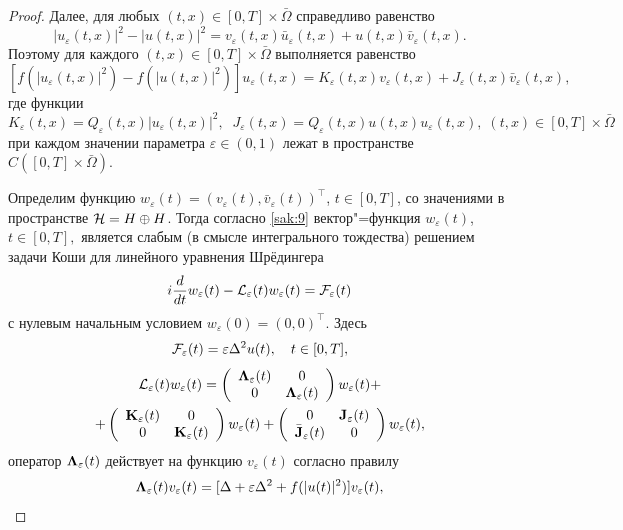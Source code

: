 \begin{proof}
Далее, для любых $(t,x)\in [0,T]\times \bar \Omega $ справедливо
равенство $$|u_{\varepsilon }(t,x)|^2-|u(t,x)|^2=v_{\varepsilon  }(t,x)\bar u_{\varepsilon }(t,x)+u(t,x)\bar v_{\varepsilon 
}(t,x).$$
Поэтому для каждого $(t,x)\in [0,T]\times \bar \Omega $ выполняется
равенство $$[f(|u_{\varepsilon }(t,x)|^2)-f(|u(t,x)|^2)]u_{\varepsilon 
}(t,x)=K_{\varepsilon }(t,x)v_{\varepsilon }(t,x)+J_{\varepsilon }(t,x)\bar v_{\varepsilon }(t,x),$$ где
функции 
$$K_{\varepsilon }(t,x)=Q_{\varepsilon }(t,x) |u_{\varepsilon }(t,x)|^2,\; \;
J_{\varepsilon }(t,x)=Q_{\varepsilon }(t,x) u(t,x)u_{\varepsilon }(t,x), \;  (t,x)\in [0,T]\times \bar \Omega $$ 
при каждом значении  параметра $\varepsilon \in (0,1)$  лежат в пространстве
$C([0,T]\times \bar \Omega )$.

Определим функцию $w_{\varepsilon }(t)=\left( v_{\varepsilon}(t),  \bar v_{\varepsilon }(t)\right)^\top$, $t\in [0,T]$, со значениями в пространстве
${\cal H}=H\oplus H$. Тогда  согласно \eqref{sak:9} вектор"=функция $w_{\varepsilon  }(t)$, $t\in [0, T],$ является слабым (в смысле интегрального тождества) решением задачи Коши для линейного уравнения Шрёдингера
$$
i{{d }\over {d t}}w_{\varepsilon }(t) - {\cal L}_{\varepsilon }(t)w_{\varepsilon  }(t)={\cal F}_{\varepsilon  }(t)
$$
с нулевым начальным условием $w_{\varepsilon  }(0)=\left( 0, 0\right)^\top.$
Здесь 
$${\cal F}_{\varepsilon }(t)=\varepsilon \Delta ^{2}u(t),\quad  t\in [0, T],$$ 
\begin{multline}
{\cal L}_{\varepsilon  }(t)w_{\varepsilon }(t)=\left(
\begin{array}{cc}
{\bf \Lambda }_{\varepsilon }(t) & 0\\
0 & {\bf \Lambda }_{\varepsilon }(t)
\end{array} \right)w_{\varepsilon }(t) + \\
+\left(
\begin{array}{cc}
{\bf K}_{\varepsilon }(t)& 0\\
0&  {\bf K}_{\varepsilon }(t)
\end{array} \right)w_{\varepsilon }(t)+\left(
\begin{array}{cc}
0 & {{\bf J}_{\varepsilon }(t)}\\
{\bar {\bf J}_{\varepsilon }(t)} & 0
\end{array} \right) w_{\varepsilon }(t),
\end{multline}
оператор ${\bf \Lambda }_{\varepsilon }(t)$ действует  на функцию $v_{\varepsilon }(t)$
согласно правилу $${\bf \Lambda }_{\varepsilon }(t)v_{\varepsilon }(t)=[\Delta +\varepsilon \Delta
^{2}+f(|u(t)|^2)]v_{\varepsilon }(t),$$ 

\end{proof}
